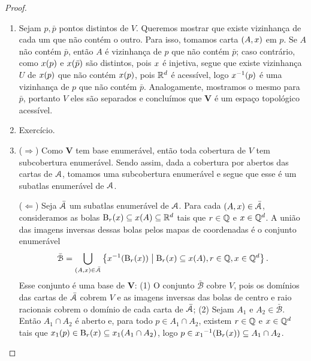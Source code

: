 \begin{proof}
	\begin{enumerate}
	\item Sejam $p,\bar p$ pontos distintos de $V$. Queremos mostrar que existe vizinhança de cada um que não contém o outro. Para isso, tomamos carta $(A,x)$ em $p$. Se $A$ não contém $\bar p$, então $A$ é vizinhança de $p$ que não contém $\bar p$; caso contrário, como $x(p)$ e $x(\bar p)$ são distintos, pois $x$ é injetiva, segue que existe vizinhança $U$ de $x(p)$ que não contém $x(p)$, pois $\mathbb{R}^d$ é acessível, logo $x^{-1}(p)$ é uma vizinhança de $p$ que não contém $\bar p$. Analogamente, mostramos o mesmo para $\bar p$, portanto $V$ eles são separados e concluímos que $\bm V$ é um espaço topológico acessível.
	
	\item Exercício.
	
	\item ($\Rightarrow$) Como $\bm V$ tem base enumerável, então toda cobertura de $V$ tem subcobertura enumerável. Sendo assim, dada a cobertura por abertos das cartas de $\mathcal{A}$, tomamos uma subcobertura enumerável e segue que esse é um subatlas enumerável de $\mathcal{A}$.

($\Leftarrow$) Seja $\bar {\mathcal{A}}$ um subatlas enumerável de $\mathcal{A}$. Para cada $(A,x) \in \bar {\mathcal{A}}$, consideramos as bolas $\mathrm{B}_r(x) \subseteq x(A) \subseteq \mathbb{R}^d$ tais que $r \in \mathbb{Q}$ e $x \in \mathbb{Q}^d$. A união das imagens inversas dessas bolas pelos mapas de coordenadas é o conjunto enumerável
	\begin{equation*}
	\bar{\mathcal B} = \bigcup_{(A,x) \in \bar {\mathcal{A}}} \left\{{x^{-1}(\mathrm{B}_r(x))}\;\middle\vert\;{\mathrm{B}_r(x) \subseteq x(A),  r \in \mathbb{Q}, x \in \mathbb{Q}^d}\right\}.
	\end{equation*}
Esse conjunto é uma base de $\bm V$: (1) O conjunto $\bar{\mathcal B}$ cobre $V$, pois os domínios das cartas de $\bar{\mathcal{A}}$ cobrem $V$ e as imagens inversas das bolas de centro e raio racionais cobrem o domínio de cada carta de $\bar{\mathcal{A}}$; (2) Sejam $A_1$ e $A_2 \in \bar{\mathcal B}$. Então $A_1 \cap A_2$ é aberto e, para todo $p \in A_1 \cap A_2$, existem $r \in \mathbb{Q}$ e $x \in \mathbb{Q}^d$ tais que $x_1(p) \in \mathrm{B}_{r}(x) \subseteq x_1(A_1 \cap A_2)$, logo $p \in {x_1}^{-1}(\mathrm{B}_r(x)) \subseteq A_1 \cap A_2$.
	

\end{enumerate}
\end{proof}
